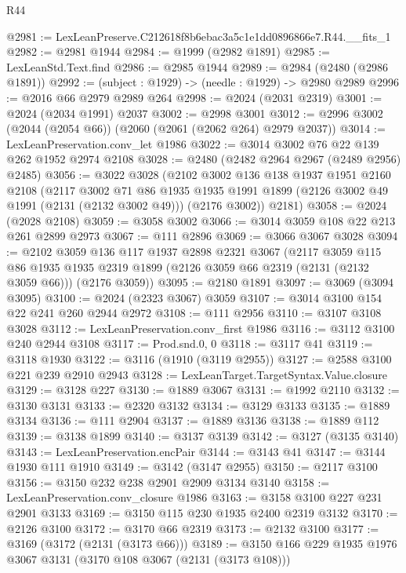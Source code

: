 \begin{lexlean}{R44}
\begin{coremodule}
@2981 := LexLeanPreserve.C212618f8b6ebac3a5c1e1dd0896866e7.R44.__fits_1
@2982 := @2981 @1944
@2984 := @1999 (@2982 @1891)
@2985 := LexLeanStd.Text.find
@2986 := @2985 @1944
@2989 := @2984 (@2480 (@2986 @1891))
@2992 := (subject : @1929) -> (needle : @1929) -> @2980 @2989
@2996 := @2016 @66 @2979 @2989 @264
@2998 := @2024 (@2031 @2319)
@3001 := @2024 (@2034 @1991) @2037
@3002 := @2998 @3001
@3012 := @2996 @3002 (@2044 (@2054 @66)) (@2060 (@2061 (@2062 @264) @2979 @2037))
@3014 := LexLeanPreservation.conv_let @1986
@3022 := @3014 @3002 @76 @22 @139 @262 @1952 @2974 @2108
@3028 := @2480 (@2482 @2964 @2967 (@2489 @2956) @2485)
@3056 := @3022
    @3028
    (@2102
      @3002
      @136
      @138
      @1937
      @1951
      @2160
      @2108
      (@2117
        @3002
        @71
        @86
        @1935
        @1935
        @1991
        @1899
        (@2126 @3002 @49 @1991 (@2131 (@2132 @3002 @49)))
        (@2176 @3002))
      @2181)
@3058 := @2024 (@2028 @2108)
@3059 := @3058 @3002
@3066 := @3014 @3059 @108 @22 @213 @261 @2899 @2973
@3067 := @111 @2896
@3069 := @3066 @3067 @3028
@3094 := @2102
    @3059
    @136
    @117
    @1937
    @2898
    @2321
    @3067
    (@2117
      @3059
      @115
      @86
      @1935
      @1935
      @2319
      @1899
      (@2126 @3059 @66 @2319 (@2131 (@2132 @3059 @66)))
      (@2176 @3059))
@3095 := @2180 @1891
@3097 := @3069 (@3094 @3095)
@3100 := @2024 (@2323 @3067) @3059
@3107 := @3014 @3100 @154 @22 @241 @260 @2944 @2972
@3108 := @111 @2956
@3110 := @3107 @3108 @3028
@3112 := LexLeanPreservation.conv_first @1986
@3116 := @3112 @3100 @240 @2944 @3108
@3117 := Prod.snd.{0, 0}
@3118 := @3117 @41
@3119 := @3118 @1930
@3122 := @3116 (@1910 (@3119 @2955))
@3127 := @2588 @3100 @221 @239 @2910 @2943
@3128 := LexLeanTarget.TargetSyntax.Value.closure
@3129 := @3128 @227
@3130 := @1889 @3067
@3131 := @1992 @2110
@3132 := @3130 @3131
@3133 := @2320 @3132
@3134 := @3129 @3133
@3135 := @1889 @3134
@3136 := @111 @2904
@3137 := @1889 @3136
@3138 := @1889 @112
@3139 := @3138 @1899
@3140 := @3137 @3139
@3142 := @3127 (@3135 @3140)
@3143 := LexLeanPreservation.encPair
@3144 := @3143 @41
@3147 := @3144 @1930 @111 @1910
@3149 := @3142 (@3147 @2955)
@3150 := @2117 @3100
@3156 := @3150 @232 @238 @2901 @2909 @3134 @3140
@3158 := LexLeanPreservation.conv_closure @1986
@3163 := @3158 @3100 @227 @231 @2901 @3133
@3169 := @3150 @115 @230 @1935 @2400 @2319 @3132
@3170 := @2126 @3100
@3172 := @3170 @66 @2319
@3173 := @2132 @3100
@3177 := @3169 (@3172 (@2131 (@3173 @66)))
@3189 := @3150 @166 @229 @1935 @1976 @3067 @3131 (@3170 @108 @3067 (@2131 (@3173 @108)))

\end{coremodule}
\end{lexlean}
